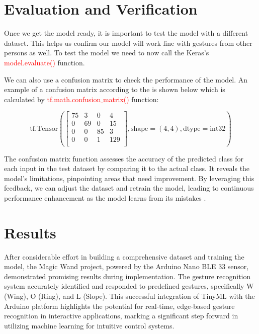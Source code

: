 %
%
\chapter{Evaluation and Verification}

Once we get the model ready, it is important to test the model with a different dataset. This helps us confirm our model will work fine with gestures from other persons as well. To test the model we need to now call the Keras's \textcolor{red}{model.evaluate()} function.\cite{Warden:2020}

We can also use a confusion matrix to check the performance of the model. An example of a confusion matrix according to the \cite{Warden:2020} is shown below which is calculated by \textcolor{red}{ tf.math.confusion$\_$matrix()} function:

\[
\text{{tf.Tensor}} \left(
\begin{bmatrix}
	75 & 3 & 0 & 4 \\
	0 & 69 & 0 & 15 \\
	0 & 0 & 85 & 3 \\
	0 & 0 & 1 & 129 \\
\end{bmatrix},
\text{{shape}}=(4, 4),
\text{{dtype}}=\text{{int32}}
\right)
\]

The confusion matrix function assesses the accuracy of the predicted class for each input in the test dataset by comparing it to the actual class. It reveals the model's limitations, pinpointing areas that need improvement. By leveraging this feedback, we can adjust the dataset and retrain the model, leading to continuous performance enhancement as the model learns from its mistakes \cite{Warden:2020}.

\chapter{Results}
\label{Results}
After considerable effort in building a comprehensive dataset and training the model, the Magic Wand project, powered by the Arduino Nano BLE 33 sensor, demonstrated promising results during implementation. The gesture recognition system accurately identified and responded to predefined gestures, specifically W (Wing), O (Ring), and L (Slope). This successful integration of TinyML with the Arduino platform highlights the potential for real-time, edge-based gesture recognition in interactive applications, marking a significant step forward in utilizing machine learning for intuitive control systems.

